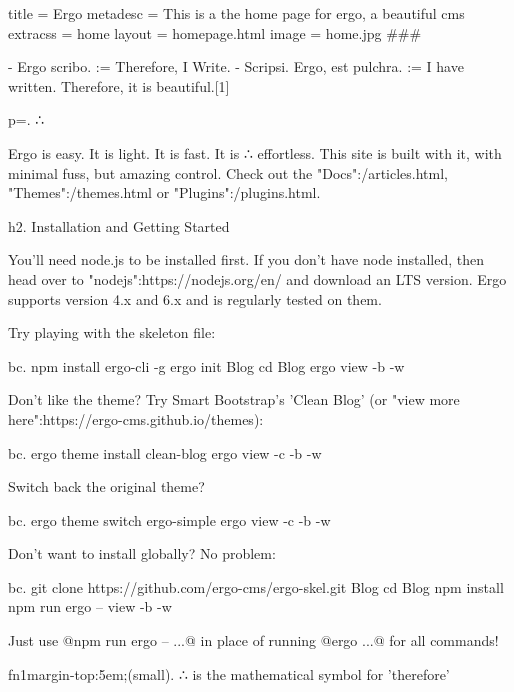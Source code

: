 title = Ergo
metadesc = This is a the home page for ergo, a beautiful cms
extracss = home
layout = homepage.html
image = home.jpg
###


- Ergo scribo. := Therefore, I Write.
- Scripsi. Ergo, est pulchra. :=  I have written. Therefore, it is beautiful.[1]


p=. ∴ 


Ergo is easy. It is light. It is fast. It is ∴ effortless. This site is built with it, with minimal fuss, but amazing control. Check out the "Docs":/articles.html, "Themes":/themes.html or "Plugins":/plugins.html.

h2. Installation and Getting Started

You'll need node.js to be installed first. If you don't have node installed, then head over to "nodejs":https://nodejs.org/en/ and download an LTS version. Ergo supports version 4.x and 6.x and is regularly tested on them.

Try playing with the skeleton file:

bc. npm install ergo-cli -g
ergo init Blog
cd Blog
ergo view -b -w

Don't like the theme? Try Smart Bootstrap's 'Clean Blog' (or "view more here":https://ergo-cms.github.io/themes):

bc. ergo theme install clean-blog
ergo view -c -b -w

Switch back the original theme? 

bc. ergo theme switch ergo-simple
ergo view -c -b -w

Don't want to install globally? No problem:

bc. git clone https://github.com/ergo-cms/ergo-skel.git Blog
cd Blog
npm install
npm run ergo -- view -b -w

Just use @npm run ergo --  ...@ in place of running @ergo ...@ for all commands!

fn1{margin-top:5em;}(small). ∴ is the mathematical symbol for 'therefore'
